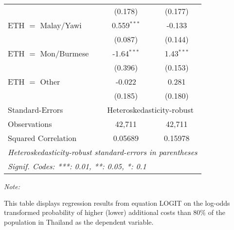 \begin{table}[htbp!]
\begin{adjustbox}{width = 1\textwidth, max height = 0.95\textheight, center}
\begin{threeparttable}[b]
\begin{tabular}{lcc}
                                   & (0.178)        & (0.177)\\   
            ETH $=$ Malay/Yawi     & 0.559$^{***}$  & -0.133\\   
                                   & (0.087)        & (0.144)\\   
            ETH $=$ Mon/Burmese    & -1.64$^{***}$  & 1.43$^{***}$\\   
                                   & (0.396)        & (0.153)\\   
            ETH $=$ Other          & -0.022         & 0.281\\   
                                   & (0.185)        & (0.180)\\   
            \midrule 
            Standard-Errors & \multicolumn{2}{c}{Heteroskedasticity-robust} \\ 
            Observations           & 42,711         & 42,711\\  
            Squared Correlation    & 0.05689        & 0.15978\\  
            \midrule \midrule
            \multicolumn{3}{l}{\emph{Heteroskedasticity-robust standard-errors in parentheses}}\\
            \multicolumn{3}{l}{\emph{Signif. Codes: ***: 0.01, **: 0.05, *: 0.1}}\\
         \end{tabular}
         
         \begin{tablenotes}\item \medskip \textit{Note:}
            \item This table displays regression results from equation LOGIT on the log-odds transformed probability of higher (lower) additional costs than 80\% of the population in Thailand as the dependent variable. 
         \end{tablenotes}
      \end{threeparttable}
   \end{adjustbox}
\end{table}


